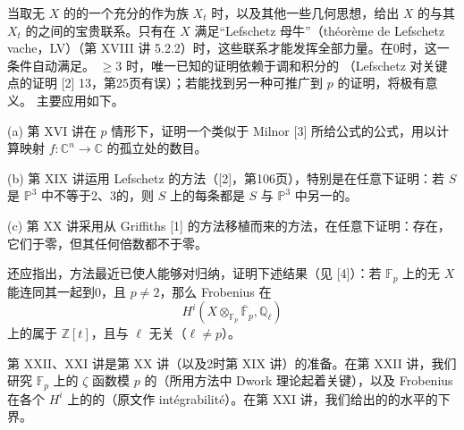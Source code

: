 当取无 $X$ 的的一个充分的作为族 $X_t$ 时，以及其他一些几何思想，给出 $X$ 的与其 $X_t$ 的之间的宝贵联系。只有在 $X$ 满足“Lefschetz 母牛”（théorème de Lefschetz vache，LV）（第 XVIII 讲 5.2.2）时，这些联系才能发挥全部力量。在0时，这一条件自动满足。 $\geq3$ 时，唯一已知的证明依赖于调和积分的 （Lefschetz 对关键点的证明 [2] 13，第25页有误）；若能找到另一种可推广到 $p$ 的证明，将极有意义。
主要应用如下。

(a) 第 XVI 讲在 $p$ 情形下，证明一个类似于 Milnor [3] 所给公式的公式，用以计算映射 $f:\mathbb C^n\to\mathbb C$ 的孤立处的数目。

(b) 第 XIX 讲运用 Lefschetz 的方法（[2]，第106页），特别是在任意下证明：若 $S$ 是 $\mathbb P^3$ 中不等于2、3的，则 $S$ 上的每条都是 $S$ 与 $\mathbb P^3$ 中另一的。

(c) 第 XX 讲采用从 Griffiths [1] 的方法移植而来的方法，在任意下证明：存在，它们于零，但其任何倍数都不于零。

还应指出，方法最近已使人能够对归纳，证明下述结果（见 [4]）：若 $\mathbb F_p$ 上的无 $X$ 能连同其一起到0，且 $p\ne2$，那么 Frobenius 在
\[
H^i(X\otimes_{\mathbb F_p}\overline{\mathbb F}_p,\mathbb Q_\ell)
\]
上的属于 $\mathbb Z[t]$，且与 $\ell$ 无关（$\ell\ne p$）。

第 XXII、XXI 讲是第 XX 讲（以及2时第 XIX 讲）的准备。在第 XXII 讲，我们研究 $\mathbb F_p$ 上的 $\zeta$ 函数模 $p$ 的（所用方法中 Dwork 理论起着关键），以及 Frobenius 在各个 $H^i$ 上的的（原文作 intégrabilité）。在第 XXI 讲，我们给出的的水平的下界。

